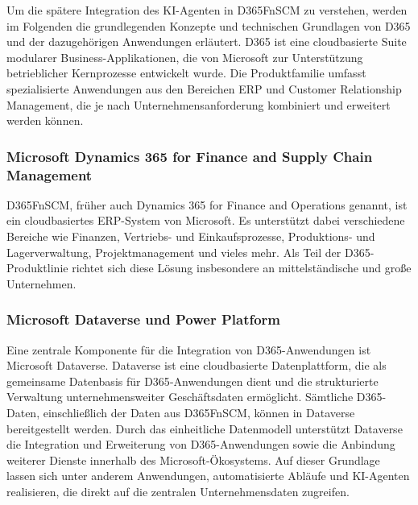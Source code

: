Um die spätere Integration des \ac{KI}-Agenten in \ac{D365FnSCM} zu verstehen, werden im Folgenden die grundlegenden Konzepte und technischen Grundlagen von \ac{D365} und der dazugehörigen Anwendungen erläutert. \ac{D365} ist eine cloudbasierte Suite modularer Business-Applikationen, die von Microsoft zur Unterstützung betrieblicher Kernprozesse entwickelt wurde. Die Produktfamilie umfasst spezialisierte Anwendungen aus den Bereichen \ac{ERP} und Customer Relationship Management, die je nach Unternehmensanforderung kombiniert und erweitert werden können. \cite{noauthor_what_nodate}

\subsubsection{Microsoft Dynamics 365 for Finance and Supply Chain Management}

\ac{D365FnSCM}, früher auch Dynamics 365 for Finance and Operations genannt, ist ein cloudbasiertes \ac{ERP}-System von Microsoft. Es unterstützt dabei verschiedene Bereiche wie Finanzen, Vertriebs- und Einkaufsprozesse, Produktions- und Lagerverwaltung, Projektmanagement und vieles mehr. Als Teil der \ac{D365}-Produktlinie richtet sich diese Lösung insbesondere an mittelständische und große Unternehmen. \cite[\pagef 19ff]{mohta_implementing_2017}

\subsubsection{Microsoft Dataverse und Power Platform}

Eine zentrale Komponente für die Integration von \ac{D365}-Anwendungen ist Microsoft Dataverse. Dataverse ist eine cloudbasierte Datenplattform, die als gemeinsame Datenbasis für \ac{D365}-Anwendungen dient und die strukturierte Verwaltung unternehmensweiter Geschäftsdaten ermöglicht. Sämtliche \ac{D365}-Daten, einschließlich der Daten aus \ac{D365FnSCM}, können in Dataverse bereitgestellt werden. Durch das einheitliche Datenmodell unterstützt Dataverse die Integration und Erweiterung von \ac{D365}-Anwendungen sowie die Anbindung weiterer Dienste innerhalb des Microsoft-Ökosystems. Auf dieser Grundlage lassen sich unter anderem Anwendungen, automatisierte Abläufe und \ac{KI}-Agenten realisieren, die direkt auf die zentralen Unternehmensdaten zugreifen. \cite{milindav_abrufen_2025}


